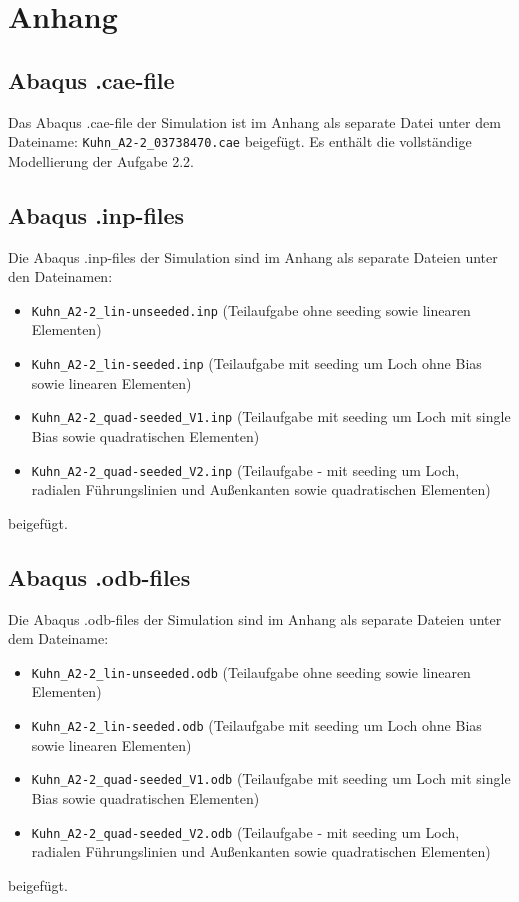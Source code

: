 \chapter{Anhang}
\label{sec:Anhang}

\section{Abaqus .cae-file}
\label{sec:Abaqus .cae-file}

Das Abaqus .cae-file der Simulation ist im Anhang als separate Datei unter dem Dateiname: \verb+Kuhn_A2-2_03738470.cae+ beigefügt. Es enthält die vollständige Modellierung der Aufgabe 2.2.

\section{Abaqus .inp-files}
\label{sec:Abaqus .inp-files}

Die Abaqus .inp-files der Simulation sind im Anhang als separate Dateien unter den Dateinamen:
\begin{itemize}
    \item \verb+Kuhn_A2-2_lin-unseeded.inp+ (Teilaufgabe  ohne seeding sowie linearen Elementen)
    \item \verb+Kuhn_A2-2_lin-seeded.inp+ (Teilaufgabe  mit seeding um Loch ohne Bias sowie linearen Elementen)
    \item \verb+Kuhn_A2-2_quad-seeded_V1.inp+ (Teilaufgabe  mit seeding um Loch mit single Bias sowie quadratischen Elementen)
    \item \verb+Kuhn_A2-2_quad-seeded_V2.inp+ (Teilaufgabe  - mit seeding um Loch, radialen Führungslinien und Außenkanten sowie quadratischen Elementen)
\end{itemize}
beigefügt.

\section{Abaqus .odb-files}
\label{sec:Abaqus .odb-files}

Die Abaqus .odb-files der Simulation sind im Anhang als separate Dateien unter dem Dateiname:
\begin{itemize}
    \item \verb+Kuhn_A2-2_lin-unseeded.odb+ (Teilaufgabe  ohne seeding sowie linearen Elementen)
    \item \verb+Kuhn_A2-2_lin-seeded.odb+ (Teilaufgabe  mit seeding um Loch ohne Bias sowie linearen Elementen)
    \item \verb+Kuhn_A2-2_quad-seeded_V1.odb+ (Teilaufgabe  mit seeding um Loch mit single Bias sowie quadratischen Elementen)
    \item \verb+Kuhn_A2-2_quad-seeded_V2.odb+ (Teilaufgabe  - mit seeding um Loch, radialen Führungslinien und Außenkanten sowie quadratischen Elementen)
\end{itemize}
beigefügt.

